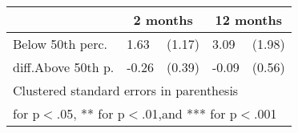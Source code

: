{
\def\sym#1{\ifmmode^{#1}\else\(^{#1}\)\fi}
\begin{tabular*}{.65\hsize}{@{\hskip\tabcolsep\extracolsep\fill}l*{2}{lc}}
\toprule
                &\multicolumn{2}{c}{2 months}&\multicolumn{2}{c}{12 months}\\
\midrule
Below 50th perc.&     1.63         &   (1.17)&     3.09         &   (1.98)\\
diff.Above 50th p.&    -0.26         &   (0.39)&    -0.09         &   (0.56)\\
\bottomrule
\multicolumn{5}{l}{\footnotesize Clustered standard errors in parenthesis}\\
\multicolumn{5}{l}{\footnotesize * for p$<$.05, ** for p$<$.01,and *** for p$<$.001}\\
\end{tabular*}
}
